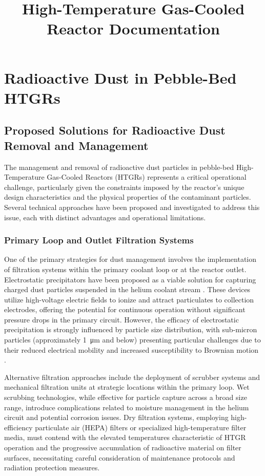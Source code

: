 \documentclass[12pt,a4paper]{article}
\title{High-Temperature Gas-Cooled Reactor Documentation}
\author{}
\date{}
\begin{document}
\maketitle

\section{Radioactive Dust in Pebble-Bed HTGRs}

\subsection{Proposed Solutions for Radioactive Dust Removal and Management}

The management and removal of radioactive dust particles in pebble-bed High-Temperature Gas-Cooled Reactors (HTGRs) represents a critical operational challenge, particularly given the constraints imposed by the reactor's unique design characteristics and the physical properties of the contaminant particles. Several technical approaches have been proposed and investigated to address this issue, each with distinct advantages and operational limitations.

\subsubsection{Primary Loop and Outlet Filtration Systems}

One of the primary strategies for dust management involves the implementation of filtration systems within the primary coolant loop or at the reactor outlet. Electrostatic precipitators have been proposed as a viable solution for capturing charged dust particles suspended in the helium coolant stream \cite{Moormann2018Caution}. These devices utilize high-voltage electric fields to ionize and attract particulates to collection electrodes, offering the potential for continuous operation without significant pressure drops in the primary circuit. However, the efficacy of electrostatic precipitation is strongly influenced by particle size distribution, with sub-micron particles (approximately 1~\si{\micro\meter} and below) presenting particular challenges due to their reduced electrical mobility and increased susceptibility to Brownian motion \cite{Xie2017HTR10Dust}.

Alternative filtration approaches include the deployment of scrubber systems and mechanical filtration units at strategic locations within the primary loop. Wet scrubbing technologies, while effective for particle capture across a broad size range, introduce complications related to moisture management in the helium circuit and potential corrosion issues. Dry filtration systems, employing high-efficiency particulate air (HEPA) filters or specialized high-temperature filter media, must contend with the elevated temperatures characteristic of HTGR operation and the progressive accumulation of radioactive material on filter surfaces, necessitating careful consideration of maintenance protocols and radiation protection measures.
\end{document}
